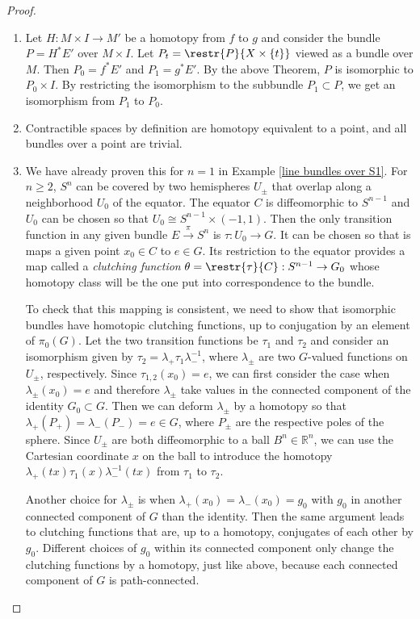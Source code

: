 \documentclass[english,letterpaper]{article}%
\numberwithin{equation}{section}
\numberwithin{figure}{section}
\numberwithin{table}{section}
\theoremstyle{definition}
\theoremstyle{definition}
\theoremstyle{definition}
\theoremstyle{plain}
\theoremstyle{plain}
\theoremstyle{plain}
\theoremstyle{plain}
\theoremstyle{remark}
\theoremstyle{remark}
\renewcommand{\geq}{\geqslant}
\begin{document}
\begin{proof}
\begin{enumerate}
    \item Let $H:M\times I\to M'$ be a homotopy from $f$ to $g$ and consider the bundle $P=H^\ast E'$ over $M\times I$. Let $P_t=\restr{P}{X\times\{t\}}$ viewed as a bundle over $M$. Then $P_0=f^\ast E'$ and $P_1=g^\ast E'$. By the above Theorem, $P$ is isomorphic to $P_0\times I$. By restricting the isomorphism to the subbundle $P_1\subset P$, we get an isomorphism from $P_1$ to $P_0$.
    \item Contractible spaces by definition are homotopy equivalent to a point, and all bundles over a point are trivial.
    \item 
    We have already proven this for $n=1$ in Example \ref{line bundles over S1}. For $n\geq 2$, $S^n$ can be covered by two hemispheres $U_\pm$ that overlap along a neighborhood $U_0$ of the equator. The equator $C$ is diffeomorphic to $S^{n-1}$ and $U_0$ can be chosen so that $U_0\cong S^{n-1}\times (-1,1)$. Then the only transition function in any given bundle $E\overset{\pi}{\to}S^n$ is $\tau:U_0\to G$. It can be chosen so that is maps a given point $x_0\in C$ to $e\in G$. Its restriction to the equator provides a map called a \emph{clutching function} $\theta=\restr{\tau}{C}:S^{n-1}\to G_0$ whose homotopy class will be the one put into correspondence to the bundle. 
     
    To check that this mapping is consistent, we need to show that isomorphic bundles have homotopic clutching functions, up to conjugation by an element of $\pi_0(G)$. Let the two transition functions be $\tau_1$ and $\tau_2$ and consider an isomorphism given by $\tau_2=\lambda_+ \tau_1 \lambda_-^{-1}$, where $\lambda_\pm$ are two $G$-valued functions on $U_\pm$, respectively. Since $\tau_{1,2}(x_0)=e$, we can first consider the case when $\lambda_\pm(x_0)=e$ and therefore $\lambda_\pm$ take values in the connected component of the identity $G_0\subset G$. Then we can deform $\lambda_\pm$ by a homotopy so that $\lambda_+(P_+)=\lambda_-(P_-)=e\in G$, where $P_\pm$ are the respective poles of the sphere. Since $U_\pm $ are both diffeomorphic to a ball $B^n\in\mathbb{R}^n$, we can use the Cartesian coordinate $x$ on the ball to introduce the homotopy $\lambda_+(tx)\tau_1(x) \lambda_-^{-1}(tx)$ from $\tau_1$ to $\tau_2$. 
    
    Another choice for $\lambda_\pm$ is when $\lambda_+(x_0)=\lambda_-(x_0)=g_0$ with $g_0$ in another connected component of $G$ than the identity. Then the same argument leads to clutching functions that are, up to a homotopy, conjugates of each other by $g_0$. Different choices of $g_0$ within its connected component only change the clutching functions by a homotopy, just like above, because each connected component of $G$ is path-connected.
    

\end{enumerate}
\end{proof}
\end{document}
